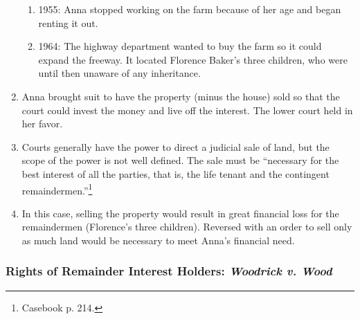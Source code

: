 \begin{enumerate}
\begin{enumerate}
        \item 1955: Anna stopped working on the farm because of her age and 
        began renting it out.
        \item 1964: The highway department wanted to buy the farm so it could 
        expand the freeway. It located Florence Baker's three children, who 
        were until then unaware of any inheritance.
    \end{enumerate}
    \item Anna brought suit to have the property (minus the house) sold so 
    that the court could invest the money and live off the interest. The lower 
    court held in her favor.
    \item Courts generally have the power to direct a judicial sale of land, 
    but the scope of the power is not well defined. The sale must be 
    ``necessary for the best interest of all the parties, that is, the life 
    tenant and the contingent remaindermen.''\footnote{Casebook p. 214.}
    \item In this case, selling the property would result in great financial 
    loss for the remaindermen (Florence's three children). Reversed with an 
    order to sell only as much land would be necessary to meet Anna's 
    financial need.
\end{enumerate}

\subsubsection{Rights of Remainder Interest Holders: \emph{Woodrick v. Wood}}

